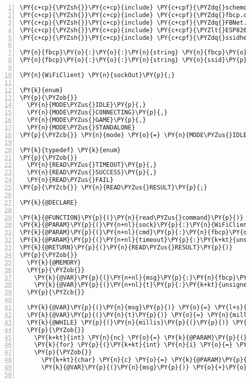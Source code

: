 \begin{Verbatim}[commandchars=\\\{\},numbers=left,firstnumber=1,stepnumber=1,frame=leftline,numbersep=0pt]
\PY{c+cp}{\PYZsh{}}\PY{c+cp}{include} \PY{c+cpf}{\PYZdq{}schemo.h\PYZdq{}}
\PY{c+cp}{\PYZsh{}}\PY{c+cp}{include} \PY{c+cpf}{\PYZdq{}fbcp.common.h\PYZdq{}}
\PY{c+cp}{\PYZsh{}}\PY{c+cp}{include} \PY{c+cpf}{\PYZdq{}FBNet.h\PYZdq{}}
\PY{c+cp}{\PYZsh{}}\PY{c+cp}{include} \PY{c+cpf}{\PYZlt{}ESP8266WiFi.h\PYZgt{}}
\PY{c+cp}{\PYZsh{}}\PY{c+cp}{include} \PY{c+cpf}{\PYZdq{}ssidheap.h\PYZdq{}}

\PY{n}{fbcp}\PY{o}{:}\PY{o}{:}\PY{n}{string} \PY{n}{fbcp}\PY{o}{:}\PY{o}{:}\PY{n}{serial}\PY{p}{;}
\PY{n}{fbcp}\PY{o}{:}\PY{o}{:}\PY{n}{string} \PY{n}{ssid}\PY{p}{;}

\PY{n}{WiFiClient} \PY{n}{sockOut}\PY{p}{;}

\PY{k}{enum}
\PY{p}{\PYZob{}}
  \PY{n}{MODE\PYZus{}IDLE}\PY{p}{,}
  \PY{n}{MODE\PYZus{}CONNECTING}\PY{p}{,}
  \PY{n}{MODE\PYZus{}GAME}\PY{p}{,}
  \PY{n}{MODE\PYZus{}STANDALONE}
\PY{p}{\PYZcb{}} \PY{n}{mode} \PY{o}{=} \PY{n}{MODE\PYZus{}IDLE}\PY{p}{;}

\PY{k}{typedef} \PY{k}{enum}
\PY{p}{\PYZob{}}
  \PY{n}{READ\PYZus{}TIMEOUT}\PY{p}{,}
  \PY{n}{READ\PYZus{}SUCCESS}\PY{p}{,}
  \PY{n}{READ\PYZus{}FAIL}
\PY{p}{\PYZcb{}} \PY{n}{READ\PYZus{}RESULT}\PY{p}{;}

\PY{k}{@DECLARE}

\PY{k}{@FUNCTION}\PY{p}{(}\PY{n}{read\PYZus{}command}\PY{p}{)}
\PY{k}{@PARAM}\PY{p}{(}\PY{n+nl}{sock}\PY{p}{:}\PY{n}{WiFiClient}\PY{o}{*}\PY{p}{)}
\PY{k}{@PARAM}\PY{p}{(}\PY{n+nl}{cmd}\PY{p}{:}\PY{n}{fbcp}\PY{o}{:}\PY{o}{:}\PY{n}{COMMAND\PYZus{}LINE}\PY{o}{*}\PY{p}{)}
\PY{k}{@PARAM}\PY{p}{(}\PY{n+nl}{timeout}\PY{p}{:}\PY{k+kt}{unsigned} \PY{k+kt}{long}\PY{p}{)}
\PY{k}{@RETURN}\PY{p}{(}\PY{n}{READ\PYZus{}RESULT}\PY{p}{)}
\PY{p}{\PYZob{}}
  \PY{k}{@MEMORY}
  \PY{p}{\PYZob{}}
    \PY{k}{@VAR}\PY{p}{(}\PY{n+nl}{msg}\PY{p}{:}\PY{n}{fbcp}\PY{o}{:}\PY{o}{:}\PY{n}{string}\PY{p}{)}
    \PY{k}{@VAR}\PY{p}{(}\PY{n+nl}{t}\PY{p}{:}\PY{k+kt}{unsigned} \PY{k+kt}{long}\PY{p}{)}
  \PY{p}{\PYZcb{}}  
  
  \PY{k}{@VAR}\PY{p}{(}\PY{n}{msg}\PY{p}{)} \PY{o}{=} \PY{l+s}{\PYZdq{}}\PY{l+s}{\PYZdq{}}\PY{p}{;}
  \PY{k}{@VAR}\PY{p}{(}\PY{n}{t}\PY{p}{)} \PY{o}{=} \PY{n}{millis}\PY{p}{(}\PY{p}{)}\PY{p}{;}
  \PY{k}{@WHILE} \PY{p}{(}\PY{n}{millis}\PY{p}{(}\PY{p}{)} \PY{o}{\PYZhy{}} \PY{k}{@VAR}\PY{p}{(}\PY{n}{t}\PY{p}{)} \PY{o}{\PYZlt{}} \PY{k}{@PARAM}\PY{p}{(}\PY{n}{timeout}\PY{p}{)}\PY{p}{)}
  \PY{p}{\PYZob{}}
    \PY{k+kt}{int} \PY{n}{nc} \PY{o}{=} \PY{k}{@PARAM}\PY{p}{(}\PY{n}{sock}\PY{p}{)}\PY{o}{\PYZhy{}}\PY{o}{\PYZgt{}}\PY{n}{available}\PY{p}{(}\PY{p}{)}\PY{p}{;}
    \PY{k}{for} \PY{p}{(}\PY{k+kt}{int} \PY{n}{i} \PY{o}{=} \PY{l+m+mi}{0}\PY{p}{;} \PY{n}{i} \PY{o}{\PYZlt{}} \PY{n}{nc}\PY{p}{;} \PY{o}{+}\PY{o}{+}\PY{n}{i}\PY{p}{)}
    \PY{p}{\PYZob{}}
      \PY{k+kt}{char} \PY{n}{c} \PY{o}{=} \PY{k}{@PARAM}\PY{p}{(}\PY{n}{sock}\PY{p}{)}\PY{o}{\PYZhy{}}\PY{o}{\PYZgt{}}\PY{n}{read}\PY{p}{(}\PY{p}{)}\PY{p}{;}
      \PY{k}{@VAR}\PY{p}{(}\PY{n}{msg}\PY{p}{)} \PY{o}{+}\PY{o}{=} \PY{n}{c}\PY{p}{;}
      

\end{Verbatim}
